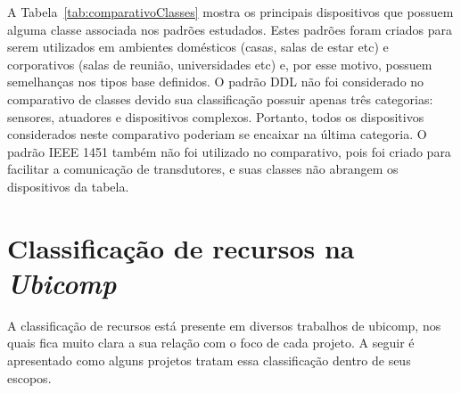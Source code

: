 A Tabela~\ref{tab:comparativoClasses} mostra os principais dispositivos que possuem alguma classe associada nos padrões estudados. Estes padrões foram criados para serem utilizados em ambientes domésticos (casas, salas de estar etc) e corporativos (salas de reunião, universidades etc) e, por esse motivo, possuem semelhanças nos tipos base definidos. O padrão DDL não foi considerado no comparativo de classes devido sua classificação possuir apenas três categorias: sensores, atuadores e dispositivos complexos. Portanto, todos os dispositivos considerados neste comparativo poderiam se encaixar na última categoria. O padrão IEEE 1451 também não foi utilizado no comparativo, pois foi criado para facilitar a comunicação de transdutores, e suas classes não abrangem os dispositivos da tabela. 
\section{Classificação de recursos na \emph{Ubicomp}}
\label{sec:correlatos}

A classificação de recursos está presente em diversos trabalhos de ubicomp, nos quais fica muito clara a sua relação com o foco de cada projeto. A seguir é apresentado como alguns projetos tratam essa classificação dentro de seus escopos.




